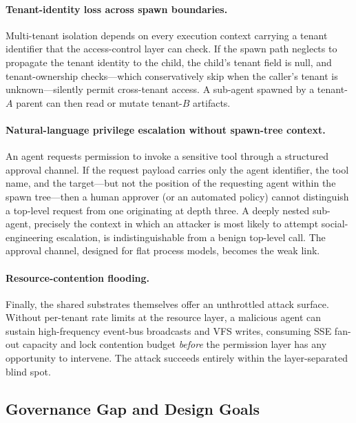 \paragraph{Tenant-identity loss across spawn boundaries.}
Multi-tenant isolation depends on every execution context carrying a tenant
identifier that the access-control layer can check. If the spawn path neglects
to propagate the tenant identity to the child, the child's tenant field is
null, and tenant-ownership checks---which conservatively skip when the
caller's tenant is unknown---silently permit cross-tenant access. A sub-agent
spawned by a tenant-$A$ parent can then read or mutate tenant-$B$ artifacts.

\paragraph{Natural-language privilege escalation without spawn-tree context.}
An agent requests permission to invoke a sensitive tool through a structured
approval channel. If the request payload carries only the agent identifier,
the tool name, and the target---but not the position of the requesting agent
within the spawn tree---then a human approver (or an automated policy) cannot
distinguish a top-level request from one originating at depth three. A deeply
nested sub-agent, precisely the context in which an attacker is most likely to
attempt social-engineering escalation, is indistinguishable from a benign
top-level call. The approval channel, designed for flat process models, becomes
the weak link.

\paragraph{Resource-contention flooding.}
Finally, the shared substrates themselves offer an unthrottled attack surface.
Without per-tenant rate limits at the resource layer, a malicious agent can
sustain high-frequency event-bus broadcasts and VFS writes, consuming SSE
fan-out capacity and lock contention budget \emph{before} the permission layer
has any opportunity to intervene. The attack succeeds entirely within the
layer-separated blind spot.

\subsection{Governance Gap and Design Goals}
\label{sec:bg-goals}

